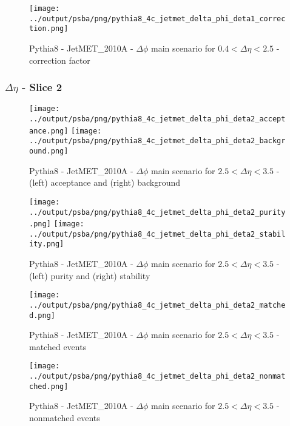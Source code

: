 \documentclass[11pt]{book}
\begin{document}
\begin{figure}[ht]
\centering
\texttt{[image: ../output/psba/png/pythia8\_4c\_jetmet\_delta\_phi\_deta1\_correction.png]}
\caption{Pythia8 - JetMET\_2010A - $\Delta\phi$ main scenario for $0.4 < \Delta\eta < 2.5$ - correction factor}
\label{fig:p8_jetmet_delta_phi_deta1_correction}
\end{figure}


\clearpage
\subsubsection{$\Delta\eta$ - Slice 2}

\begin{figure}[ht]
\centering
\texttt{[image: ../output/psba/png/pythia8\_4c\_jetmet\_delta\_phi\_deta2\_acceptance.png]}
\texttt{[image: ../output/psba/png/pythia8\_4c\_jetmet\_delta\_phi\_deta2\_background.png]}
\caption{Pythia8 - JetMET\_2010A - $\Delta\phi$ main scenario for $2.5 < \Delta\eta < 3.5$ - (left) acceptance and (right) background}
\label{fig:p8_jetmet_delta_phi_deta2_ab}
\end{figure}

\begin{figure}[ht]
\centering
\texttt{[image: ../output/psba/png/pythia8\_4c\_jetmet\_delta\_phi\_deta2\_purity.png]}
\texttt{[image: ../output/psba/png/pythia8\_4c\_jetmet\_delta\_phi\_deta2\_stability.png]}
\caption{Pythia8 - JetMET\_2010A - $\Delta\phi$ main scenario for $2.5 < \Delta\eta < 3.5$ - (left) purity and (right) stability}
\label{fig:p8_jetmet_delta_phi_deta2_ps}
\end{figure}

\begin{figure}[ht]
\centering
\texttt{[image: ../output/psba/png/pythia8\_4c\_jetmet\_delta\_phi\_deta2\_matched.png]}
\caption{Pythia8 - JetMET\_2010A - $\Delta\phi$ main scenario for $2.5 < \Delta\eta < 3.5$ - matched events}
\label{fig:p8_jetmet_delta_phi_deta2_matched}
\end{figure}

\begin{figure}[ht]
\centering
\texttt{[image: ../output/psba/png/pythia8\_4c\_jetmet\_delta\_phi\_deta2\_nonmatched.png]}
\caption{Pythia8 - JetMET\_2010A - $\Delta\phi$ main scenario for $2.5 < \Delta\eta < 3.5$ - nonmatched events}
\label{fig:p8_jetmet_delta_phi_deta2_nonmatched}
\end{figure}
\end{document}
